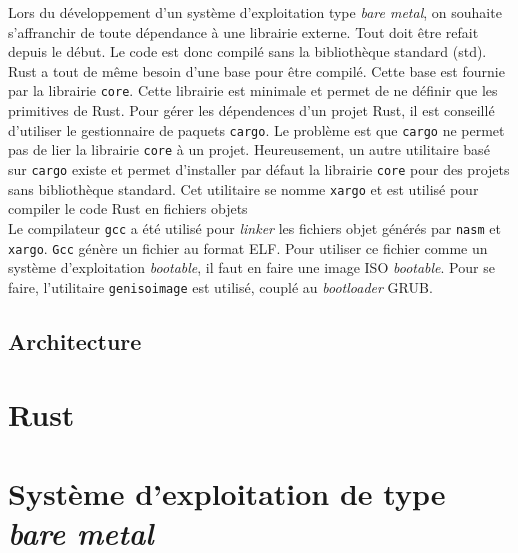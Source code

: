 \documentclass[a4paper]{article}
\begin{document}
Lors du développement d'un système d'exploitation type \textit{bare metal}, on souhaite
s'affranchir de toute dépendance à une librairie externe. Tout doit être refait depuis
le début. Le code est donc compilé sans la bibliothèque standard (std). Rust a tout
de même besoin d'une base pour être compilé. Cette base est fournie par la librairie
\texttt{core}. Cette librairie est minimale et permet de ne définir que
les primitives de Rust. Pour gérer les dépendences d'un projet Rust, il est conseillé
d'utiliser le gestionnaire de paquets \texttt{cargo}. Le problème est que 
\texttt{cargo} ne permet pas de lier la librairie \texttt{core} à
un projet. Heureusement, un autre utilitaire basé sur \texttt{cargo} existe et 
permet d'installer par défaut la librairie \texttt{core} pour des projets 
sans bibliothèque standard. Cet utilitaire se nomme \texttt{xargo} et est utilisé
pour compiler le code Rust en fichiers objets \\

Le compilateur \texttt{gcc} a été utilisé pour \textit{linker} les fichiers
objet générés par \texttt{nasm} et \texttt{xargo}. \texttt{Gcc}
génère un fichier au format ELF. Pour utiliser ce fichier comme un système d'exploitation
\textit{bootable}, il faut en faire une image ISO \textit{bootable}. Pour se faire,
l'utilitaire \texttt{genisoimage} est utilisé, couplé au \textit{bootloader}
GRUB.


\subsection{Architecture}


\section{Rust}


\section{Système d’exploitation de type \textit{bare metal}}
\end{document}

